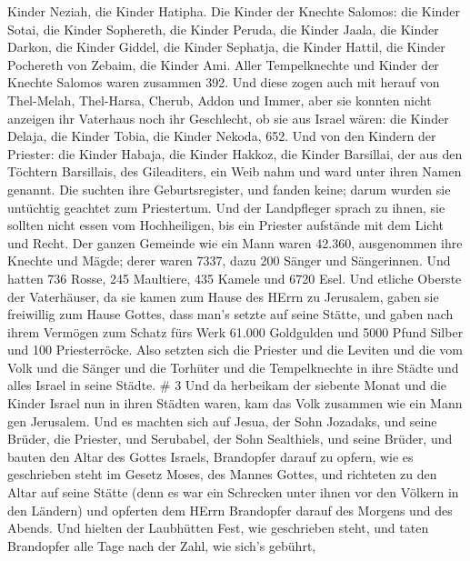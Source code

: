 Kinder Neziah, die Kinder Hatipha.  Die Kinder der Knechte
Salomos: die Kinder Sotai, die Kinder Sophereth, die Kinder Peruda,
 die Kinder Jaala, die Kinder Darkon, die Kinder Giddel,
 die Kinder Sephatja, die Kinder Hattil, die Kinder
Pochereth von Zebaim, die Kinder Ami.  Aller Tempelknechte
und Kinder der Knechte Salomos waren zusammen 392.  Und
diese zogen auch mit herauf von Thel-Melah, Thel-Harsa, Cherub, Addon
und Immer, aber sie konnten nicht anzeigen ihr Vaterhaus noch ihr
Geschlecht, ob sie aus Israel wären:  die Kinder Delaja,
die Kinder Tobia, die Kinder Nekoda, 652.  Und von den
Kindern der Priester: die Kinder Habaja, die Kinder Hakkoz, die Kinder
Barsillai, der aus den Töchtern Barsillais, des Gileaditers, ein Weib
nahm und ward unter ihren Namen genannt.  Die suchten ihre
Geburtsregister, und fanden keine; darum wurden sie untüchtig geachtet
zum Priestertum.  Und der Landpfleger sprach zu ihnen, sie
sollten nicht essen vom Hochheiligen, bis ein Priester aufstände mit dem
Licht und Recht.  Der ganzen Gemeinde wie ein Mann waren
42.360,  ausgenommen ihre Knechte und Mägde; derer waren
7337, dazu 200 Sänger und Sängerinnen.  Und hatten 736
Rosse, 245 Maultiere,  435 Kamele und 6720 Esel.
 Und etliche Oberste der Vaterhäuser, da sie kamen zum
Hause des HErrn zu Jerusalem, gaben sie freiwillig zum Hause Gottes,
dass man's setzte auf seine Stätte,  und gaben nach ihrem
Vermögen zum Schatz fürs Werk 61.000 Goldgulden und 5000 Pfund Silber
und 100 Priesterröcke.  Also setzten sich die Priester und
die Leviten und die vom Volk und die Sänger und die Torhüter und die
Tempelknechte in ihre Städte und alles Israel in seine Städte. \# 3
 Und da herbeikam der siebente Monat und die Kinder Israel
nun in ihren Städten waren, kam das Volk zusammen wie ein Mann gen
Jerusalem.  Und es machten sich auf Jesua, der Sohn
Jozadaks, und seine Brüder, die Priester, und Serubabel, der Sohn
Sealthiels, und seine Brüder, und bauten den Altar des Gottes Israels,
Brandopfer darauf zu opfern, wie es geschrieben steht im Gesetz Moses,
des Mannes Gottes,  und richteten zu den Altar auf seine
Stätte (denn es war ein Schrecken unter ihnen vor den Völkern in den
Ländern) und opferten dem HErrn Brandopfer darauf des Morgens und des
Abends.  Und hielten der Laubhütten Fest, wie geschrieben
steht, und taten Brandopfer alle Tage nach der Zahl, wie sich's gebührt,

